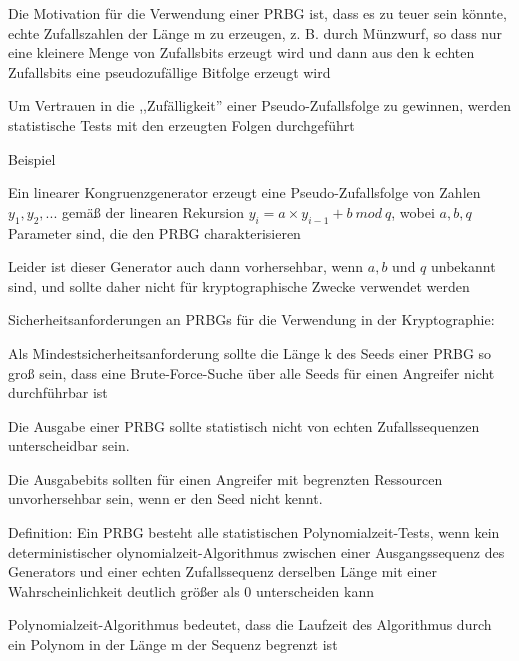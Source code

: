 \documentclass[a4paper]{article}
\begin{document}
\begin{multicols}{3}
\begin{itemize*}
\begin{itemize*}
                  \item Die Motivation für die Verwendung einer PRBG ist, dass es zu teuer sein könnte, echte Zufallszahlen der Länge m zu erzeugen, z. B. durch Münzwurf, so dass nur eine kleinere Menge von Zufallsbits erzeugt wird und dann aus den k echten Zufallsbits eine pseudozufällige Bitfolge erzeugt wird
                  \item Um Vertrauen in die ,,Zufälligkeit'' einer Pseudo-Zufallsfolge zu gewinnen, werden statistische Tests mit den erzeugten Folgen durchgeführt
            \end{itemize*}
            \item Beispiel
            \begin{itemize*}
                  \item Ein linearer Kongruenzgenerator erzeugt eine Pseudo-Zufallsfolge von Zahlen $y_1,y_2, ...$ gemäß der linearen Rekursion $y_i= a\times y_{i-1} + b\ mod\ q$, wobei $a, b, q$ Parameter sind, die den PRBG charakterisieren
                  \item Leider ist dieser Generator auch dann vorhersehbar, wenn $a, b$ und $q$ unbekannt sind, und sollte daher nicht für kryptographische Zwecke verwendet werden
            \end{itemize*}
            \item Sicherheitsanforderungen an PRBGs für die Verwendung in der Kryptographie:
            \begin{itemize*}
                  \item Als Mindestsicherheitsanforderung sollte die Länge k des Seeds einer PRBG so groß sein, dass eine Brute-Force-Suche über alle Seeds für einen Angreifer nicht durchführbar ist
                  \item Die Ausgabe einer PRBG sollte statistisch nicht von echten Zufallssequenzen unterscheidbar sein.
                  \item Die Ausgabebits sollten für einen Angreifer mit begrenzten Ressourcen unvorhersehbar sein, wenn er den Seed nicht kennt.
            \end{itemize*}
            \item Definition: Ein PRBG besteht alle statistischen Polynomialzeit-Tests, wenn kein deterministischer olynomialzeit-Algorithmus zwischen einer Ausgangssequenz des Generators und einer echten Zufallssequenz derselben Länge mit einer Wahrscheinlichkeit deutlich größer als 0 unterscheiden kann
            \item Polynomialzeit-Algorithmus bedeutet, dass die Laufzeit des Algorithmus durch ein Polynom in der Länge m der Sequenz begrenzt ist

\end{itemize*}
\end{multicols}
\end{document}
